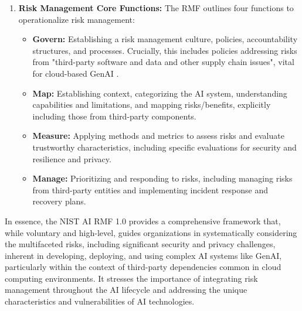 \begin{enumerate}
    \item \textbf{Risk Management Core Functions:} The RMF outlines four functions to operationalize risk management:
    \begin{itemize}
      \item \textbf{Govern:} Establishing a risk management culture, policies, accountability structures, and processes. Crucially, this includes policies addressing risks from "third-party software and data and other supply chain issues", vital for cloud-based GenAI \cite[pp.21-24]{tabassi_artificial_2023}.
        \item \textbf{Map:} Establishing context, categorizing the AI system, understanding capabilities and limitations, and mapping risks/benefits, explicitly including those from third-party components\cite{tabassi_artificial_2023}.
        \item \textbf{Measure:} Applying methods and metrics to assess risks and evaluate trustworthy characteristics, including specific evaluations for security and resilience and privacy\cite{tabassi_artificial_2023}.
        \item \textbf{Manage:} Prioritizing and responding to risks, including managing risks from third-party entities and implementing incident response and recovery plans\cite{tabassi_artificial_2023}.
    \end{itemize}
\end{enumerate}

In essence, the NIST AI RMF 1.0 provides a comprehensive framework that, while voluntary and high-level, guides organizations in systematically considering the multifaceted risks, including significant security and privacy challenges, inherent in developing, deploying, and using complex AI systems like GenAI, particularly within the context of third-party dependencies common in cloud computing environments. It stresses the importance of integrating risk management throughout the AI lifecycle and addressing the unique characteristics and vulnerabilities of AI technologies.

